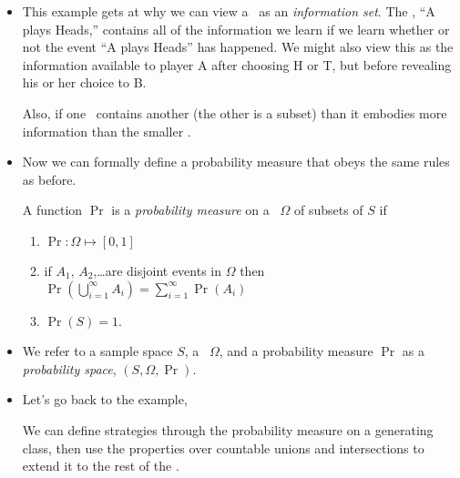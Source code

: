 \begin{itemize}
\item This example gets at why we can view a \sigmaalgebra\ as an
  \emph{information set}.  The \sigmaalgebra, ``A plays Heads,'' contains
  all of the information we learn if we learn whether or not the event
  ``A plays Heads'' has happened.  We might
  also view this as the information available to player A after choosing
  H or T, but before revealing his or her choice to B.

  Also, if one \sigmaalgebra\ contains another (the other is a subset) than
  it embodies more information than the smaller \sigmaalgebra.

\item Now we can formally define a probability measure that obeys the
  same rules as before.
  \begin{defn} A function $\Pr$ is a \emph{probability measure} on a
    \sigmaalgebra\ $\Omega$ of subsets of $S$ if
    \begin{enumerate}
    \item $\Pr: \Omega \mapsto [0,1]$
    \item if $A_1$, $A_2$,\dots are disjoint events in $\Omega$ then
      $\Pr(\bigcup_{i=1}^\infty A_i) = \sum_{i=1}^\infty \Pr(A_i)$
    \item $\Pr(S) = 1$.
    \end{enumerate}
  \end{defn}
  
\item We refer to a sample space $S$, a \sigmaalgebra\ $\Omega$, and a
  probability measure $\Pr$ as a \emph{probability space}, $(S, \Omega,
  \Pr)$.

\item Let's go back to the example,
  \begin{ex}
    We can define strategies through the probability measure on a
    generating class, then use the properties over countable unions
    and intersections to extend it to the rest of the \sigmaalgebra.


\end{ex}
\end{itemize}
